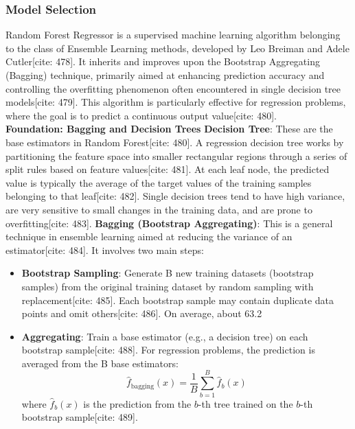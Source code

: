 \documentclass[12pt]{report}
\begin{document}
{{{\subsubsection{Model Selection}
Random Forest Regressor is a supervised machine learning algorithm belonging to the class of Ensemble Learning methods, developed by Leo Breiman and Adele Cutler[cite: 478]. It inherits and improves upon the Bootstrap Aggregating (Bagging) technique, primarily aimed at enhancing prediction accuracy and controlling the overfitting phenomenon often encountered in single decision tree models[cite: 479]. This algorithm is particularly effective for regression problems, where the goal is to predict a continuous output value[cite: 480].\\
\textbf{Foundation: Bagging and Decision Trees}
\textbf{Decision Tree}: These are the base estimators in Random Forest[cite: 480]. A regression decision tree works by partitioning the feature space into smaller rectangular regions through a series of split rules based on feature values[cite: 481]. At each leaf node, the predicted value is typically the average of the target values of the training samples belonging to that leaf[cite: 482]. Single decision trees tend to have high variance, are very sensitive to small changes in the training data, and are prone to overfitting[cite: 483].
\textbf*{Bagging (Bootstrap Aggregating)}: This is a general technique in ensemble learning aimed at reducing the variance of an estimator[cite: 484]. It involves two main steps:

\begin{itemize}
    \item \textbf{Bootstrap Sampling}: Generate B new training datasets (bootstrap samples) from the original training dataset by random sampling with replacement[cite: 485]. Each bootstrap sample may contain duplicate data points and omit others[cite: 486]. On average, about 63.2%
    \item \textbf{Aggregating}: Train a base estimator (e.g., a decision tree) on each bootstrap sample[cite: 488]. For regression problems, the prediction is averaged from the B base estimators:
    \[
    \hat{f}_{\text{bagging}}(x) = \frac{1}{B} \sum_{b=1}^{B} \hat{f}_b(x)
    \]
    where $\hat{f}_b(x)$ is the prediction from the $b$-th tree trained on the $b$-th bootstrap sample[cite: 489].
\end{itemize}

}}}
\end{document}
